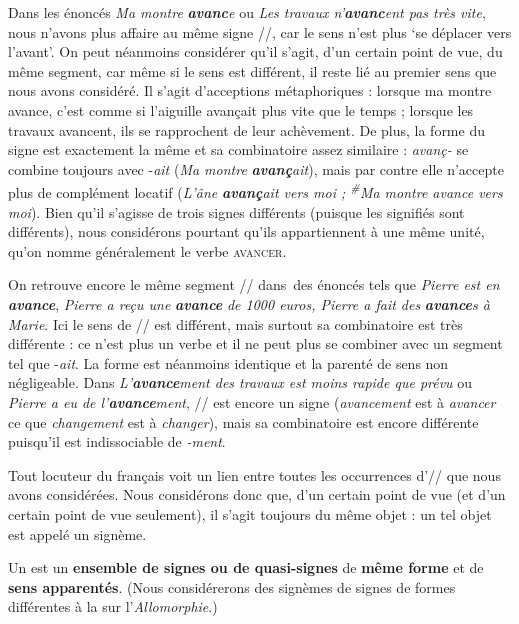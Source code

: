 Dans les énoncés \textit{Ma montre} \textbf{\textit{avanc}}\textit{e} ou \textit{Les travaux n’}\textbf{\textit{avanc}}\textit{ent pas très vite}, nous n’avons plus affaire au même signe //, car le sens n’est plus ‘se déplacer vers l’avant’. On peut néanmoins considérer qu’il s’agit, d’un certain point de vue, du même segment, car même si le sens est différent, il reste lié au premier sens que nous avons considéré. Il s’agit d’acceptions métaphoriques : lorsque ma montre avance, c’est comme si l’aiguille avançait plus vite que le temps ; lorsque les travaux avancent, ils se rapprochent de leur achèvement. De plus, la forme du signe est exactement la même et sa combinatoire assez similaire : \textit{avanç-} se combine toujours avec -\textit{ait} (\textit{Ma montre} \textbf{\textit{avanç}}\textit{ait}), mais par contre elle n’accepte plus de complément locatif (\textit{L’âne} \textbf{\textit{avanç}}\textit{ait vers moi ; \textsuperscript{\#}}\textit{Ma montre avance vers moi}). Bien qu’il s’agisse de trois signes différents (puisque les signifiés sont différents), nous considérons pourtant qu’ils appartiennent à une même unité, qu’on nomme généralement le verbe \textsc{avancer}.

On retrouve encore le même segment // dans~des énoncés tels que \textit{Pierre est en} \textbf{\textit{avance}}, \textit{Pierre a reçu une} \textbf{\textit{avance}} \textit{de 1000 euros, Pierre a fait des} \textbf{\textit{avance}}\textit{s à Marie}. Ici le sens de // est différent, mais surtout sa combinatoire est très différente : ce n’est plus un verbe et il ne peut plus se combiner avec un segment tel que -\textit{ait}. La forme est néanmoins identique et la parenté de sens non négligeable. Dans \textit{L’}\textbf{\textit{avance}}\textit{ment des travaux est moins rapide que prévu} ou \textit{Pierre a eu de l’}\textbf{\textit{avance}}\textit{ment}, // est encore un signe (\textit{avancement} est à \textit{avancer} ce que \textit{changement} est à \textit{changer}), mais sa combinatoire est encore différente puisqu’il est indissociable de \textit{{}-ment}.

Tout locuteur du français voit un lien entre toutes les occurrences d’// que nous avons considérées. Nous considérons donc que, d’un certain point de vue (et d’un certain point de vue seulement), il s’agit toujours du même objet : un tel objet est appelé un signème.

\begin{styleLivreImportant}
Un  est un \textbf{ensemble de signes ou de quasi-signes} de \textbf{même forme} et de \textbf{sens apparentés}. (Nous considérerons des signèmes de signes de formes différentes à la  sur l’\textit{Allomorphie}.)
\end{styleLivreImportant}

